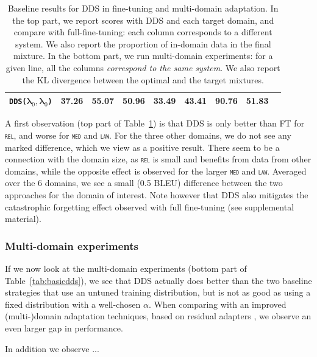 \documentclass[11pt,a4paper]{article}
\newcommand{\fyTodo}[1]{\Todo[FY:]{\textcolor{orange}{#1}}}
\newcommand{\domain}[1]{\texttt{\textsc{#1}}}
\newcommand{\system}[1]{\texttt{{#1}}}
\newcommand{\vlambda}{\ensuremath{\boldsymbol\lambda}\xspace} %
\begin{document}
\begin{table}
\begin{tabular}{|l|*8{r|}}
    \system{DDS($\vlambda_0, \vlambda_0$)} &37.26&55.07&50.96&33.49&43.41&90.76&51.83 \\ \hline
  \end{tabular}
  \caption{Baseline results for DDS in fine-tuning and multi-domain adaptation. In the top part, we report scores with DDS and each target domain, and compare with full-fine-tuning: each column corresponds to a different system. We also report the proportion of in-domain data in the final mixture. In the bottom part, we run multi-domain experiments: for a given line, all the columns \emph{correspond to the same system}. We also report the KL divergence between the optimal and the target mixtures.}
  \label{tab:basic-dds}
\end{table}

A first observation (top part of Table~\ref{tab:basic-dds}) is that DDS is only better than FT for \domain{rel}, and worse for \domain{med} and \domain{law}. For the three other domains, we do not see any marked difference, which we view as a positive result. There seem to be a connection with the domain size, as \domain{rel} is small and benefits from data from other domains, while the opposite effect is observed for the larger \domain{med} and \domain{law}. Averaged over the 6 domains, we see a small (0.5 BLEU) difference between the two approaches for the domain of interest. Note however that DDS also mitigates the catastrophic forgetting effect observed with full fine-tuning (see supplemental material).\fyTodo{Supplementary}

\subsubsection{Multi-domain experiments}

If we now look at the multi-domain experiments (bottom part of Table~\ref{tab:basicdds}), we see that DDS actually does better than the two baseline strategies that use an untuned training distribution, but is not as good as using a fixed distribution with a well-chosen $\alpha$. When comparing with an improved (multi-)domain adaptation techniques, based on residual adapters \cite{Bapna19simple,Pham20astudy}, we observe an even larger gap in performance.

In addition we observe ...\fyTodo{To be continued}
\end{document}
